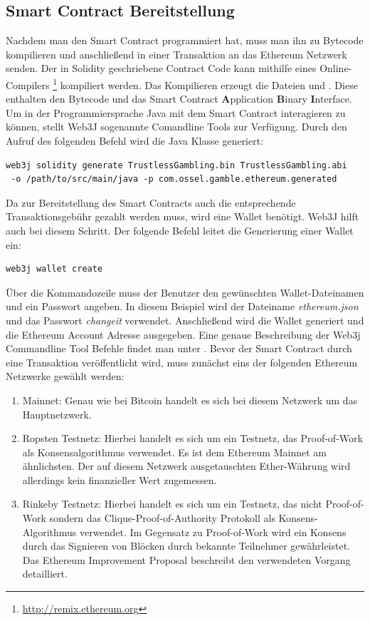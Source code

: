 \subsection{Smart Contract Bereitstellung}
Nachdem man den Smart Contract programmiert hat, muss man ihn zu Bytecode kompilieren und anschließend in einer Transaktion an das Ethereum Netzwerk senden. Der in Solidity geschriebene Contract Code kann mithilfe eines Online-Compilers \footnote{\url{http://remix.ethereum.org}} kompiliert werden. Das Kompilieren erzeugt die Dateien   und . Diese enthalten den Bytecode und das Smart Contract \textbf{A}pplication \textbf{B}inary \textbf{I}nterface.
Um in der Programmiersprache Java mit dem Smart Contract interagieren zu können, stellt Web3J sogenannte Comandline Tools zur Verfügung. Durch den Aufruf des folgenden Befehl wird die Java Klasse  generiert:
\begin{verbatim}
web3j solidity generate TrustlessGambling.bin TrustlessGambling.abi
 -o /path/to/src/main/java -p com.ossel.gamble.ethereum.generated
\end{verbatim}
Da zur Bereitstellung des Smart Contracts auch die entsprechende Transaktionsgebühr gezahlt werden muss, wird eine Wallet benötigt. Web3J hilft auch bei diesem Schritt. Der folgende Befehl leitet die Generierung einer Wallet ein:
\begin{verbatim}
web3j wallet create
\end{verbatim}
Über die Kommandozeile muss der Benutzer den gewünschten Wallet-Dateinamen  und ein Passwort angeben. In diesem Beispiel wird der Dateiname \textit{ethereum.json} und das Passwort \textit{changeit} verwendet. Anschließend wird die Wallet generiert und die Ethereum Account Adresse ausgegeben. Eine genaue Beschreibung der Web3j Commandline Tool Befehle findet man unter \cite{web3j_clt}.
Bevor der Smart Contract durch eine Transaktion veröffentlicht wird, muss zunächst eins der folgenden Ethereum Netzwerke gewählt werden:
\begin{enumerate}
\item Mainnet: Genau wie bei Bitcoin handelt es sich bei diesem Netzwerk um das Hauptnetzwerk. 
\item Ropsten Testnetz: Hierbei handelt es sich um ein Testnetz, das Proof-of-Work als Konsensalgorithmus verwendet. Es ist dem Ethereum Mainnet am ähnlichsten. Der auf diesem Netzwerk ausgetauschten Ether-Währung wird allerdings kein finanzieller Wert zugemessen.
\item Rinkeby Testnetz: Hierbei handelt es sich um ein Testnetz, das nicht Proof-of-Work sondern das Clique-Proof-of-Authority Protokoll als Konsens-Algorithmus verwendet. Im Gegensatz zu Proof-of-Work wird ein Konsens durch das Signieren von Blöcken durch bekannte Teilnehmer gewährleistet. Das Ethereum Improvement Proposal \cite{eip_rinkeby} beschreibt den verwendeten Vorgang detailliert.
\end{enumerate}
